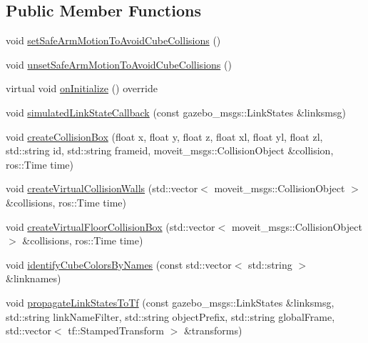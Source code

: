 \subsection*{Public Member Functions}
\begin{DoxyCompactItemize}
\item 
void \hyperlink{classsm__moveit__4_1_1cl__perception__system_1_1CpSimulatedGazeboPerception_af42b5a4e239fcac98a222c34115c9bc0}{set\+Safe\+Arm\+Motion\+To\+Avoid\+Cube\+Collisions} ()
\item 
void \hyperlink{classsm__moveit__4_1_1cl__perception__system_1_1CpSimulatedGazeboPerception_a7f5d68f2ff7dd0ade9756058e790efa1}{unset\+Safe\+Arm\+Motion\+To\+Avoid\+Cube\+Collisions} ()
\item 
virtual void \hyperlink{classsm__moveit__4_1_1cl__perception__system_1_1CpSimulatedGazeboPerception_adebc30f6b1fc905f783de3f7bdf4a711}{on\+Initialize} () override
\item 
void \hyperlink{classsm__moveit__4_1_1cl__perception__system_1_1CpSimulatedGazeboPerception_a7914ffd20518c866a8a1e11254589d12}{simulated\+Link\+State\+Callback} (const gazebo\+\_\+msgs\+::\+Link\+States \&linksmsg)
\item 
void \hyperlink{classsm__moveit__4_1_1cl__perception__system_1_1CpSimulatedGazeboPerception_aae9d3b564d1442453dac71a2d9fe89fe}{create\+Collision\+Box} (float x, float y, float z, float xl, float yl, float zl, std\+::string id, std\+::string frameid, moveit\+\_\+msgs\+::\+Collision\+Object \&collision, ros\+::\+Time time)
\item 
void \hyperlink{classsm__moveit__4_1_1cl__perception__system_1_1CpSimulatedGazeboPerception_a07c208d7fdcd61338f941bf5620a09ec}{create\+Virtual\+Collision\+Walls} (std\+::vector$<$ moveit\+\_\+msgs\+::\+Collision\+Object $>$ \&collisions, ros\+::\+Time time)
\item 
void \hyperlink{classsm__moveit__4_1_1cl__perception__system_1_1CpSimulatedGazeboPerception_a668b93281f2ab325c790e20f452f3f8f}{create\+Virtual\+Floor\+Collision\+Box} (std\+::vector$<$ moveit\+\_\+msgs\+::\+Collision\+Object $>$ \&collisions, ros\+::\+Time time)
\item 
void \hyperlink{classsm__moveit__4_1_1cl__perception__system_1_1CpSimulatedGazeboPerception_aac02fd742b0074f62d8909ce00a02d3b}{identify\+Cube\+Colors\+By\+Names} (const std\+::vector$<$ std\+::string $>$ \&linknames)
\item 
void \hyperlink{classsm__moveit__4_1_1cl__perception__system_1_1CpSimulatedGazeboPerception_a643fa78620216085ca385b74832a0abc}{propagate\+Link\+States\+To\+Tf} (const gazebo\+\_\+msgs\+::\+Link\+States \&linksmsg, std\+::string link\+Name\+Filter, std\+::string object\+Prefix, std\+::string global\+Frame, std\+::vector$<$ tf\+::\+Stamped\+Transform $>$ \&transforms)
\end{DoxyCompactItemize}
